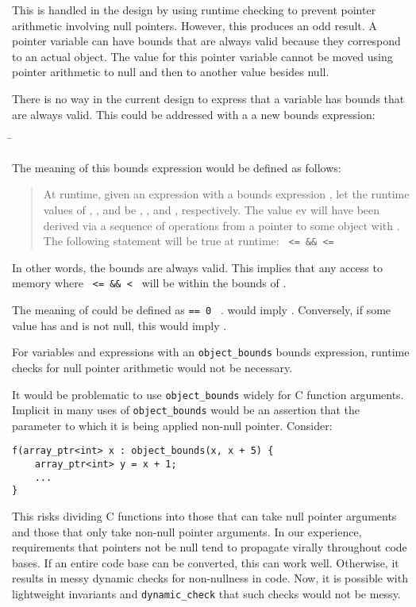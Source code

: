 This is handled in the design by using runtime checking to prevent
pointer arithmetic involving null pointers.  However, this produces
an odd result.  A pointer variable can have bounds that are always
valid because they correspond to an actual object.  The value for
this pointer variable cannot be moved using pointer arithmetic to null
and then to another value besides null.

There is no way in the current design to express that a variable has
bounds that are always valid.  This could be addressed with a 
a new bounds expression:
\begin{tabbing}
\= \\
\>
\end{tabbing}
The meaning of this bounds expression would be defined as follows:
\begin{quote}
At runtime, given an expression  with a bounds expression
, let the
runtime values of , , and  be ,
, and , respectively. The value ev will have been derived
via a sequence of operations from a pointer to some object 
with .  The following statement 
will be true at runtime: \texttt{ <=  \&\&
 <= }
\end{quote}
In other words, the bounds are always valid. This implies
that any access to memory where \texttt{ <= 
\&\&  < } will be within the bounds of .

The meaning of 
could be defined as  \texttt{== 0
\textbar{}\textbar{}} .
 would imply .
Conversely, if some value  has  and
 is not null, this would imply .

For variables and expressions with an \texttt{object\_bounds}
bounds expression, runtime checks for null pointer arithmetic
would not be necessary.

It would be problematic to use \texttt{object\_bounds} widely for
C function arguments.   Implicit in many uses of
\texttt{object\_bounds} would be an assertion that the parameter
to which it is being applied  non-null pointer.  Consider:
\begin{verbatim}
f(array_ptr<int> x : object_bounds(x, x + 5) {
    array_ptr<int> y = x + 1;
    ...
}
\end{verbatim}
This risks dividing C functions into those that can
take null pointer arguments and those that only take non-null 
pointer arguments. In our experience, requirements that pointers 
not be null tend to propagate virally throughout code bases.  If an 
entire code base can be  converted, this can work well.  Otherwise, 
it results in messy dynamic checks for non-nullness in code.
Now, it is possible with lightweight invariants and \texttt{dynamic\_check}
that such checks would not be messy.

